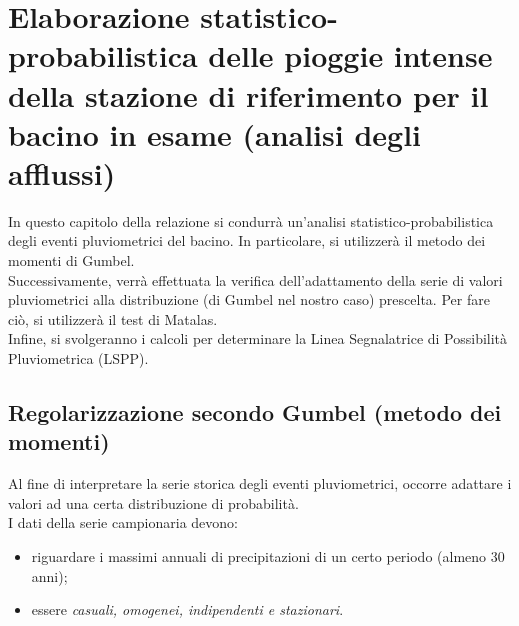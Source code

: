 \section{Elaborazione statistico-probabilistica delle pioggie intense della stazione di riferimento per il bacino in esame (analisi degli afflussi)}
In questo capitolo della relazione si condurrà un'analisi statistico-probabilistica degli eventi pluviometrici del bacino. In particolare, si utilizzerà il metodo dei momenti di Gumbel.\\
Successivamente, verrà effettuata la verifica dell'adattamento della serie di valori pluviometrici alla distribuzione (di Gumbel nel nostro caso) prescelta. Per fare ciò, si utilizzerà il test di Matalas.\\
Infine, si svolgeranno i calcoli per determinare la Linea Segnalatrice di Possibilità Pluviometrica (LSPP).

\subsection{Regolarizzazione secondo Gumbel (metodo dei momenti)}
Al fine di interpretare la serie storica degli eventi pluviometrici, occorre adattare i valori ad una certa distribuzione di probabilità.\\
I dati della serie campionaria devono: 
\begin{itemize}
    \item riguardare i massimi annuali di precipitazioni di un certo periodo (almeno 30 anni);
    \item essere \textit{casuali, omogenei, indipendenti e stazionari}.
\end{itemize}
